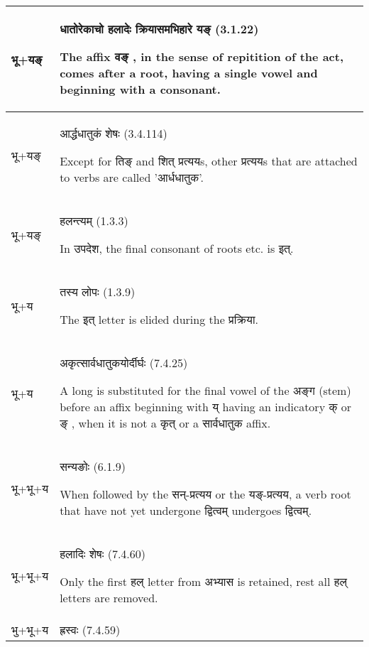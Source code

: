 		\begin{longtable}{ |p{1.5cm}|p{14.5cm}| } 
			\hline
			\rowcolor{red!10} 
			\texthindi{भू}+\texthindi{यङ्}
			&\texthindi{धातोरेकाचो हलादेः क्रियासमभिहारे यङ्} (3.1.22)
			
			The affix \texthindi{वङ्} , in the sense of repitition of the act, comes after a root, having a single vowel and beginning with a consonant.
			\\\hline
			\rowcolor{blue!10}
			\texthindi{भू}+\texthindi{यङ्}
			&\texthindi{आर्द्धधातुकं शेषः}  (3.4.114)
			
			Except for \texthindi{तिङ्} and \texthindi{शित् प्रत्यय}s, other \texthindi{प्रत्यय}s that are attached to verbs are called '\texthindi{आर्धधातुक}'.
			\\\hline
			\rowcolor{blue!10}
			\texthindi{भू}+\texthindi{यङ्}
			&\texthindi{हलन्त्यम्} (1.3.3)
			
			In \texthindi{उपदेश}, the final consonant of roots etc. is \texthindi{इत्}.
			\\\hline
			\rowcolor{blue!10}
			\texthindi{भू}+\texthindi{य}
			&\texthindi{तस्य लोपः} (1.3.9)
			
			The \texthindi{इत्} letter is elided during the \texthindi{प्रक्रिया}.
			\\\hline
			\rowcolor{green!10} 
			\texthindi{भू}+\texthindi{य}
			&\texthindi{अकृत्सार्वधातुकयोर्दीर्घः} (7.4.25)
			
			A long is substituted for the final vowel of the \texthindi{अङ्ग} (stem) before an affix beginning with \texthindi{य्} having an indicatory \texthindi{क्} or \texthindi{ङ्} , when it is not a \texthindi{कृत्} or a \texthindi{सार्वधातुक} affix.
			\\\hline
			\rowcolor{green!10} 
			\texthindi{भू}+\texthindi{भू}+\texthindi{य}
			&\texthindi{सन्यङोः} (6.1.9)
			
			When followed by the \texthindi{सन्-प्रत्यय} or the \texthindi{यङ्-प्रत्यय}, a verb root that have not yet undergone \texthindi{द्वित्वम्} undergoes \texthindi{द्वित्वम्}.
			\\\hline
			
			\rowcolor{green!10}
			\texthindi{भू}+\texthindi{भू}+\texthindi{य}
			&\texthindi{हलादिः शेषः} (7.4.60)
			
			Only the first \texthindi{हल्} letter from \texthindi{अभ्यास} is retained, rest all \texthindi{हल्} letters are removed.
			\\\hline
			\rowcolor{green!10} 
			\texthindi{भु}+\texthindi{भू}+\texthindi{य}
			&\texthindi{ह्रस्वः} (7.4.59) 
			

\end{longtable}
